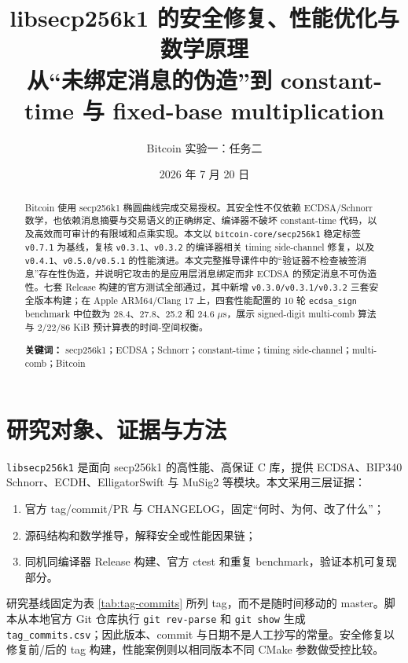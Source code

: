 \documentclass[11pt,a4paper,fontset=none]{ctexart}
\title{\bfseries libsecp256k1 的安全修复、性能优化与数学原理\\[0.5em]
\large 从“未绑定消息的伪造”到 constant-time 与 fixed-base multiplication}
\author{Bitcoin 实验一：任务二}
\date{2026 年 7 月 20 日}
\begin{document}
\maketitle

\begin{abstract}
Bitcoin 使用 secp256k1 椭圆曲线完成交易授权。其安全性不仅依赖 ECDSA/Schnorr 数学，也依赖消息摘要与交易语义的正确绑定、编译器不破坏 constant-time 代码，以及高效而可审计的有限域和点乘实现。本文以 \texttt{bitcoin-core/secp256k1} 稳定标签 \texttt{v0.7.1} 为基线，复核 \texttt{v0.3.1}、\texttt{v0.3.2} 的编译器相关 timing side-channel 修复，以及 \texttt{v0.4.1}、\texttt{v0.5.0/v0.5.1} 的性能演进。本文完整推导课件中的“验证器不检查被签消息”存在性伪造，并说明它攻击的是应用层消息绑定而非 ECDSA 的预定消息不可伪造性。七套 Release 构建的官方测试全部通过，其中新增 \texttt{v0.3.0/v0.3.1/v0.3.2} 三套安全版本构建；在 Apple ARM64/Clang 17 上，四套性能配置的 10 轮 \texttt{ecdsa\_sign} benchmark 中位数为 28.4、27.8、25.2 和 24.6 $\mu$s，展示 signed-digit multi-comb 算法与 2/22/86 KiB 预计算表的时间-空间权衡。

\textbf{关键词：} secp256k1；ECDSA；Schnorr；constant-time；timing side-channel；multi-comb；Bitcoin
\end{abstract}

\clearpage
\begingroup
\footnotesize
\setlength{\parskip}{0pt}
\linespread{0.88}\selectfont
\tableofcontents
\endgroup
\clearpage

\section{研究对象、证据与方法}

\texttt{libsecp256k1} 是面向 secp256k1 的高性能、高保证 C 库，提供 ECDSA、BIP340 Schnorr、ECDH、ElligatorSwift 与 MuSig2 等模块。本文采用三层证据：

\begin{enumerate}[leftmargin=2em]
  \item 官方 tag/commit/PR 与 CHANGELOG，固定“何时、为何、改了什么”；
  \item 源码结构和数学推导，解释安全或性能因果链；
  \item 同机同编译器 Release 构建、官方 ctest 和重复 benchmark，验证本机可复现部分。
\end{enumerate}

研究基线固定为表 \ref{tab:tag-commits} 所列 tag，而不是随时间移动的 master。脚本从本地官方 Git 仓库执行 \texttt{git rev-parse} 和 \texttt{git show} 生成 \texttt{tag\_commits.csv}；因此版本、commit 与日期不是人工抄写的常量。安全修复以修复前/后的 tag 构建，性能案例则以相同版本不同 CMake 参数做受控比较。
\end{document}
